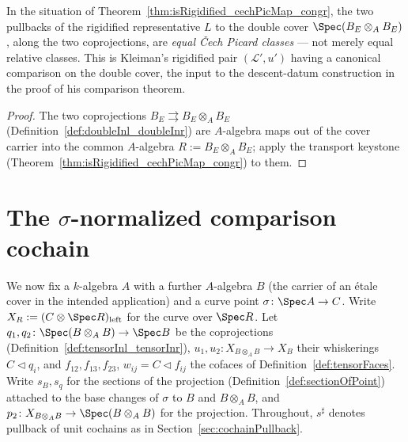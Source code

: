 \begin{theorem}
  \label{thm:isRigidified_cechPicMap_doubleInl_eq_doubleInr}
  \leanok
  In the situation of Theorem~\ref{thm:isRigidified_cechPicMap_congr}, the two pullbacks of
  the rigidified representative \(L\) to the double cover \(\Spec(B_E \otimes_A B_E)\), along
  the two coprojections, are \emph{equal \v Cech Picard classes} — not merely equal relative
  classes. This is Kleiman's rigidified pair \((\mathcal L', u')\) having a canonical comparison on
  the double cover, the input to the descent-datum construction in the proof of his
  comparison theorem.
\end{theorem}
\begin{proof}
  \leanok
  The two coprojections \(B_E \rightrightarrows B_E \otimes_A B_E\)
  (Definition~\ref{def:doubleInl_doubleInr}) are \(A\)-algebra maps out of the cover carrier
  into the common \(A\)-algebra \(R := B_E \otimes_A B_E\); apply the transport keystone
  (Theorem~\ref{thm:isRigidified_cechPicMap_congr}) to them.
\end{proof}

\section{The \texorpdfstring{\(\sigma\)}{sigma}-normalized comparison cochain}
\label{sec:normalizedComparison}

We now fix a \(k\)-algebra \(A\) with a further \(A\)-algebra \(B\) (the carrier of an \'etale
cover in the intended application) and a curve point \(\sigma \colon \Spec A \to C\).
Write \(X_R := (C \otimes \Spec R)_{\mathrm{left}}\) for the curve over \(\Spec R\). Let
\(q_1, q_2 \colon \Spec(B \otimes_A B) \to \Spec B\) be the coprojections
(Definition~\ref{def:tensorInl_tensorInr}), \(u_1, u_2 \colon X_{B \otimes_A B} \to X_B\) their
whiskerings \(C \lhd q_i\), and \(f_{12}, f_{13}, f_{23}\), \(w_{ij} = C \lhd f_{ij}\) the cofaces
of Definition~\ref{def:tensorFaces}. Write \(s_B, s_q\) for the sections of the projection
(Definition~\ref{def:sectionOfPoint}) attached to the base changes of \(\sigma\) to \(B\) and
\(B \otimes_A B\), and \(p_2 \colon X_{B \otimes_A B} \to \Spec(B \otimes_A B)\) for the
projection. Throughout, \(s^{\sharp}\) denotes pullback of unit cochains as in
Section~\ref{sec:cochainPullback}.

